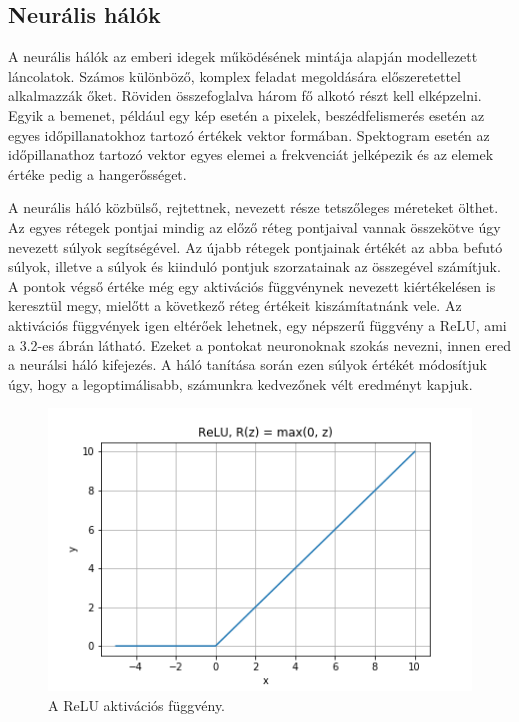 \subsection{Neurális hálók}

A neurális hálók az emberi idegek működésének mintája alapján modellezett láncolatok. Számos különböző, komplex feladat megoldására előszeretettel alkalmazzák őket. Röviden összefoglalva három fő alkotó részt kell elképzelni. Egyik a bemenet, például egy kép esetén a pixelek, beszédfelismerés esetén az egyes időpillanatokhoz tartozó értékek vektor formában. Spektogram esetén az időpillanathoz tartozó vektor egyes elemei a frekvenciát jelképezik és az elemek értéke pedig a hangerősséget.

A neurális háló közbülső, rejtettnek, nevezett része tetszőleges méreteket ölthet. Az egyes rétegek pontjai mindig az előző réteg pontjaival vannak összekötve úgy nevezett súlyok segítségével. Az újabb rétegek pontjainak értékét az abba befutó súlyok, illetve a súlyok és kiinduló pontjuk szorzatainak az összegével számítjuk. A pontok végső értéke még egy aktivációs függvénynek nevezett kiértékelésen is keresztül megy, mielőtt a következő réteg értékeit kiszámítatnánk vele. Az aktivációs függvények igen eltérőek lehetnek, egy népszerű függvény a ReLU, ami a 3.2-es ábrán látható. Ezeket a pontokat neuronoknak szokás nevezni, innen ered a neurálsi háló kifejezés. A háló tanítása során ezen súlyok értékét módosítjuk úgy, hogy a legoptimálisabb, számunkra kedvezőnek vélt eredményt kapjuk.

\begin{figure}[!ht]
\centering
\includegraphics[width=125mm, keepaspectratio]{figures/ReLU.png}
\caption{A ReLU aktivációs függvény.}
\label{fig:TeXstudio}
\end{figure}


